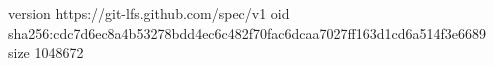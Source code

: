 version https://git-lfs.github.com/spec/v1
oid sha256:cdc7d6ec8a4b53278bdd4ec6c482f70fac6dcaa7027ff163d1cd6a514f3e6689
size 1048672
